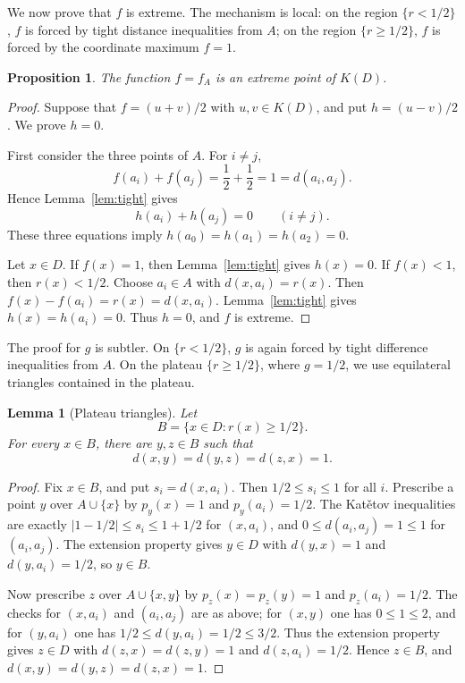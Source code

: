\documentclass{proc-l}
\numberwithin{equation}{section}
\newtheorem{proposition}[theorem]{Proposition}
\newtheorem{lemma}[theorem]{Lemma}
\theoremstyle{definition}
\theoremstyle{remark}
\begin{document}
We now prove that \(f\) is extreme.  The mechanism is local: on the region
\(\{r<1/2\}\), \(f\) is forced by tight distance inequalities from \(A\); on
the region \(\{r\ge1/2\}\), \(f\) is forced by the coordinate maximum \(f=1\).

\begin{proposition}\label{prop:f-extreme}
The function \(f=f_A\) is an extreme point of \(K(D)\).
\end{proposition}

\begin{proof}
Suppose that \(f=(u+v)/2\) with \(u,v\in K(D)\), and put \(h=(u-v)/2\).  We
prove \(h=0\).

First consider the three points of \(A\).  For \(i\ne j\),
\[
        f(a_i)+f(a_j)=\frac12+\frac12=1=d(a_i,a_j).
\]
Hence Lemma~\ref{lem:tight} gives
\[
        h(a_i)+h(a_j)=0\qquad(i\ne j).
\]
These three equations imply \(h(a_0)=h(a_1)=h(a_2)=0\).

Let \(x\in D\).  If \(f(x)=1\), then Lemma~\ref{lem:tight} gives \(h(x)=0\).  If
\(f(x)<1\), then \(r(x)<1/2\).  Choose \(a_i\in A\) with \(d(x,a_i)=r(x)\).
Then \(f(x)-f(a_i)=r(x)=d(x,a_i)\).  Lemma~\ref{lem:tight} gives
\(h(x)=h(a_i)=0\).  Thus \(h=0\), and \(f\) is extreme.
\end{proof}

The proof for \(g\) is subtler.  On \(\{r<1/2\}\), \(g\) is again forced by
tight difference inequalities from \(A\).  On the plateau \(\{r\ge1/2\}\),
where \(g=1/2\), we use equilateral triangles contained in the plateau.

\begin{lemma}[Plateau triangles]\label{lem:plateau-triangles}
Let
\[
        B=\{x\in D:r(x)\ge1/2\}.
\]
For every \(x\in B\), there are \(y,z\in B\) such that
\[
        d(x,y)=d(y,z)=d(z,x)=1.
\]
\end{lemma}

\begin{proof}
Fix \(x\in B\), and put \(s_i=d(x,a_i)\).  Then \(1/2\le s_i\le1\) for all
\(i\).  Prescribe a point \(y\) over \(A\cup\{x\}\) by
\(p_y(x)=1\) and \(p_y(a_i)=1/2\).  The Kat\v{e}tov inequalities are exactly
\(|1-1/2|\le s_i\le1+1/2\) for \((x,a_i)\), and
\(0\le d(a_i,a_j)=1\le1\) for \((a_i,a_j)\).  The extension property gives
\(y\in D\) with \(d(y,x)=1\) and \(d(y,a_i)=1/2\), so \(y\in B\).

Now prescribe \(z\) over \(A\cup\{x,y\}\) by
\(p_z(x)=p_z(y)=1\) and \(p_z(a_i)=1/2\).  The checks for \((x,a_i)\) and
\((a_i,a_j)\) are as above; for \((x,y)\) one has \(0\le1\le2\), and for
\((y,a_i)\) one has \(1/2\le d(y,a_i)=1/2\le3/2\).  Thus the extension
property gives \(z\in D\) with \(d(z,x)=d(z,y)=1\) and \(d(z,a_i)=1/2\).  Hence
\(z\in B\), and \(d(x,y)=d(y,z)=d(z,x)=1\).
\end{proof}
\end{document}
